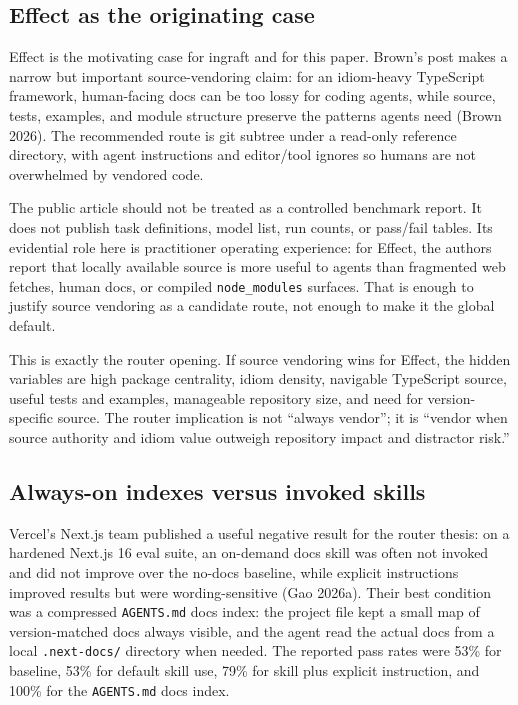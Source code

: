 \documentclass[
  11pt,
  letterpaper,
  numbers=noendperiod,
  parskip=half]{scrartcl}
\begin{document}
\subsection{Effect as the originating case}\label{sec-effect-origin}

Effect is the motivating case for ingraft and for this paper. Brown's
post makes a narrow but important source-vendoring claim: for an
idiom-heavy TypeScript framework, human-facing docs can be too lossy for
coding agents, while source, tests, examples, and module structure
preserve the patterns agents need (Brown 2026). The recommended route is
git subtree under a read-only reference directory, with agent
instructions and editor/tool ignores so humans are not overwhelmed by
vendored code.

The public article should not be treated as a controlled benchmark
report. It does not publish task definitions, model list, run counts, or
pass/fail tables. Its evidential role here is practitioner operating
experience: for Effect, the authors report that locally available source
is more useful to agents than fragmented web fetches, human docs, or
compiled \texttt{node\_modules} surfaces. That is enough to justify
source vendoring as a candidate route, not enough to make it the global
default.

This is exactly the router opening. If source vendoring wins for Effect,
the hidden variables are high package centrality, idiom density,
navigable TypeScript source, useful tests and examples, manageable
repository size, and need for version-specific source. The router
implication is not ``always vendor''; it is ``vendor when source
authority and idiom value outweigh repository impact and distractor
risk.''

\subsection{Always-on indexes versus invoked
skills}\label{sec-agents-md-evals}

Vercel's Next.js team published a useful negative result for the router
thesis: on a hardened Next.js 16 eval suite, an on-demand docs skill was
often not invoked and did not improve over the no-docs baseline, while
explicit instructions improved results but were wording-sensitive (Gao
2026a). Their best condition was a compressed \texttt{AGENTS.md} docs
index: the project file kept a small map of version-matched docs always
visible, and the agent read the actual docs from a local
\texttt{.next-docs/} directory when needed. The reported pass rates were
53\% for baseline, 53\% for default skill use, 79\% for skill plus
explicit instruction, and 100\% for the \texttt{AGENTS.md} docs index.
\end{document}
